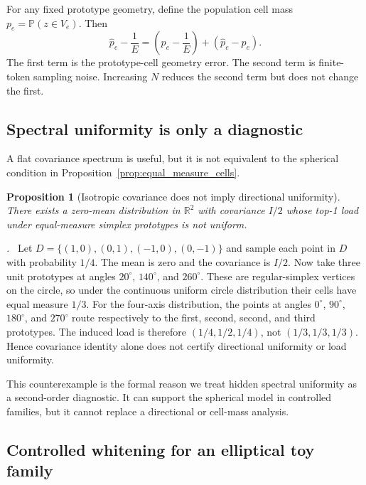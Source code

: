 \documentclass{article}
\newtheorem{proposition}{Proposition}
\renewenvironment{proof}[1][\proofname]{\par\noindent\textit{#1.}\ }{\hfill\qedsymbol\par}
\begin{document}
For any fixed prototype geometry, define the population cell mass
$p_e=\mathbb{P}(z\in V_e)$.  Then
\begin{equation}
 \widehat p_e-\frac{1}{E}
 =
 \left(p_e-\frac{1}{E}\right)
 +
 \left(\widehat p_e-p_e\right).
\end{equation}
The first term is the prototype-cell geometry error.  The second term is
finite-token sampling noise.  Increasing $N$ reduces the second term but does
not change the first.

\subsection{Spectral uniformity is only a diagnostic}

A flat covariance spectrum is useful, but it is not equivalent to the spherical
condition in Proposition~\ref{prop:equal_measure_cells}.

\begin{proposition}[Isotropic covariance does not imply directional uniformity]
\label{prop:isotropic_not_directional}
There exists a zero-mean distribution in $\mathbb{R}^2$ with covariance
$I/2$ whose top-1 load under equal-measure simplex prototypes is not uniform.
\end{proposition}

\begin{proof}
Let $D=\{(1,0),(0,1),(-1,0),(0,-1)\}$ and sample each point in $D$ with
probability $1/4$.  The mean is zero and the covariance is $I/2$.
Now take three unit prototypes at angles $20^\circ$, $140^\circ$, and
$260^\circ$.  These are regular-simplex vertices on the circle, so under the
continuous uniform circle distribution their cells have equal measure $1/3$.
For the four-axis distribution, the points at angles $0^\circ$, $90^\circ$,
$180^\circ$, and $270^\circ$ route respectively to the first, second, second,
and third prototypes.  The induced load is therefore $(1/4,1/2,1/4)$, not
$(1/3,1/3,1/3)$.  Hence covariance identity alone does not certify directional
uniformity or load uniformity.
\end{proof}

This counterexample is the formal reason we treat hidden spectral uniformity as
a second-order diagnostic.  It can support the spherical model in controlled
families, but it cannot replace a directional or cell-mass analysis.

\subsection{Controlled whitening for an elliptical toy family}
\end{document}
